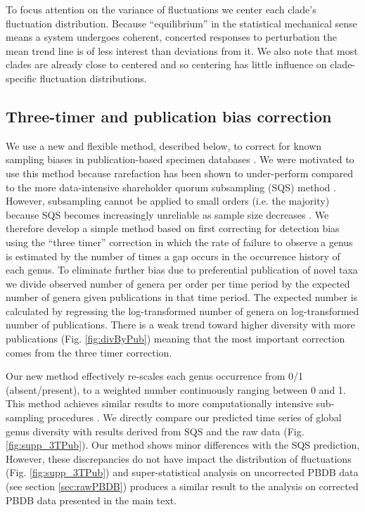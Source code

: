 \documentclass[12pt]{article}
\let\citep=\autocite
\begin{document}
To focus attention on the variance of fluctuations we center each
clade's fluctuation distribution. Because ``equilibrium'' in the
statistical mechanical sense means a system undergoes coherent,
concerted responses to perturbation the mean trend line is of less
interest than deviations from it. We also note that most clades are
already close to centered and so centering has little influence on
clade-specific fluctuation distributions.

\subsection*{Three-timer and publication bias correction} 
\label{sec:3TP}
We use a new and flexible method, described below, to correct for
known sampling biases in publication-based specimen databases
\citep{alroy08, alroy2010}.  We were motivated to use this method
because rarefaction has been shown to under-perform compared to the
more data-intensive shareholder quorum subsampling (SQS) method
\citep{alroy2010}.  However, subsampling cannot be applied to small
orders (i.e. the majority) because SQS becomes increasingly unreliable
as sample size decreases \citep{alroy2010}.  We therefore develop a
simple method based on first correcting for detection bias using the
``three timer'' correction \citep{alroy08} in which the rate of failure
to observe a genus is estimated by the number of times a gap occurs in
the occurrence history of each genus. To eliminate further bias due to
preferential publication of novel taxa we divide observed number of
genera per order per time period by the expected number of genera
given publications in that time period.  The expected number is
calculated by regressing the log-transformed number of genera on
log-transformed number of publications. There is a weak trend toward
higher diversity with more publications (Fig. \ref{fig:divByPub})
meaning that the most important correction comes from the three timer
correction.

Our new method effectively re-scales each genus occurrence from 0/1
(absent/present), to a weighted number continuously ranging between 0
and 1.  This method achieves similar results to more computationally
intensive sub-sampling procedures \citep{alroy08, alroy2010}. We
directly compare our predicted time series of global genus diversity
with results derived from SQS \citep{alroy2010} and the raw data
(Fig. \ref{fig:supp_3TPub}).  Our method shows minor differences with
the SQS prediction, However, these discrepancies do not have impact
the distribution of fluctuations (Fig. \ref{fig:supp_3TPub}) and
super-statistical analysis on uncorrected PBDB data (see section
\ref{sec:rawPBDB}) produces a similar result to the analysis on
corrected PBDB data presented in the main text.
\end{document}

